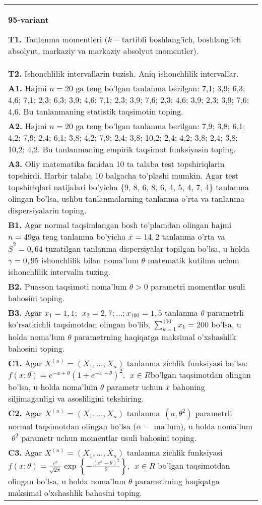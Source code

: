 \documentclass{article}
\begin{document}
\begin{tabular}{m{17cm}}
\textbf{95-variant}
\newline

\textbf{T1.} 
Tanlanma momentleri (\(k -\)tartibli boshlang'ich, boshlang'ich absolyut, markaziy va markaziy absolyut momentler).
\\
\textbf{T2.} 
Ishonchlilik intervallarin tuzish. Aniq ishonchlilik intervallar.
\\
\textbf{A1.} 
Hajmi \(n = 20\) ga teng bo'lgan tanlanma berilgan: 7,1; 3,9; 6,3; 4,6; 7,1; 2,3; 6,3; 3,9; 4,6; 7,1; 2,3; 3,9; 7,6; 2,3; 4,6; 3,9; 2,3; 3,9; 7,6; 4,6. Bu tanlanmaning statistik taqsimotin toping.
\\
\textbf{A2.} 
Hajmi \(n = 20\) ga teng bo'lgan tanlanma berilgan: 7,9; 3,8; 6,1; 4,2; 7,9; 2,4; 6,1; 3,8; 4,2; 7,9; 2,4; 3,8; 10,2; 2,4; 4,2; 3,8; 2,4; 3,8; 10,2; 4,2. Bu tanlanmaning empirik taqsimot funksiyasin toping.
\\
\textbf{A3.} 
Oliy matematika fanidan 10 ta talaba test topshiriqlarin topshirdi. Harbir talaba 10 balgacha to'plashi mumkin. Agar test topshiriqlari natijalari bo'yicha \{9, 8, 6, 8, 6, 4, 5, 4, 7, 4\} tanlanma olingan bo'lsa, ushbu tanlanmalarning tanlanma o'rta va tanlanma dispersiyalarin toping.
\\
\textbf{B1.} 
Agar normal taqsimlangan bosh to'plamdan olingan hajmi \(n = 49\)ga teng tanlanma bo'yicha \(\overline{x} = 14,2\) tanlanma o'rta va \({\overline{S}}^{2} = 0,64\) tuzatilgan tanlanma dispersiyalar topilgan bo'lsa, u holda \(\gamma = 0,95\) ishonchlilik bilan noma'lum \(\theta\) matematik kutilma uchun ishonchlilik intervalin tuzing.
\\
\textbf{B2.} 
Puasson taqsimoti noma'lum \(\theta > 0\) parametri momentlar usuli bahosini toping.
\\
\textbf{B3.} 
Agar \(x_{1} = 1,1;\ \ x_{2} = 2,7;\ldots;x_{100} = 1,5\) tanlanma \(\theta\) parametrli ko'rsatkichli taqsimotdan olingan bo'lib, \(\sum_{k = 1}^{100}x_{k} = 200\) bo'lsa, u holda noma'lum \(\theta\) parametrning haqiqatga maksimal o'xshashlik bahosini toping.
\\
\textbf{C1.} 
Agar \(X^{(n)} = \left( X_{1},...,X_{n} \right)\) tanlanma zichlik funksiyasi bo'lsa: \(f(x;\theta) = e^{- x + \theta}\left( 1 + e^{- x + \theta} \right)^{2},\ \ x \in R\)bo'lgan taqsimotdan olingan bo'lsa, u holda noma'lum \(\theta\) parametr uchun \(\overline{x}\) bahoning siljimaganligi va asosliligini tekshiring.
\\
\textbf{C2.} 
Agar \(X^{(n)} = \left( X_{1},...,X_{n} \right)\) tanlanma\(\ \ (a,\theta^{2})\) parametrli normal taqsimotdan olingan bo'lsa (\(\alpha -\) ma'lum), u holda noma'lum\(\ \ \theta^{2}\) parametr uchun momentlar usuli bahosini toping.
\\
\textbf{C3.} 
Agar \(X^{(n)} = \left( X_{1},...,X_{n} \right)\) tanlanma zichlik funksiyasi \(f(x;\theta) = \frac{e^{x}}{\sqrt{2\pi}}\exp\left\{ - \frac{\left( e^{x} - \theta \right)^{2}}{2} \right\},\ \ x \in R\) bo'lgan taqsimotdan olingan bo'lsa, u holda noma'lum \(\theta\) parametrning haqiqatga maksimal o'xshashlik bahosini toping.
\\

\end{tabular}
\end{document}
